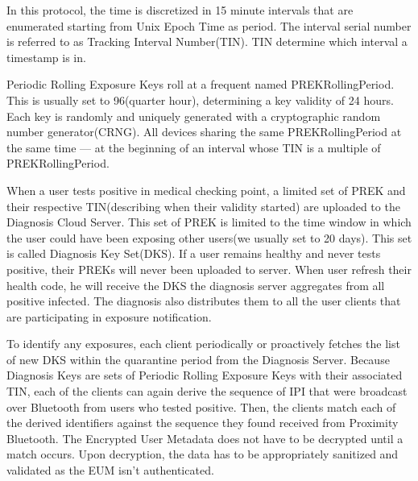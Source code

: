 \documentclass[11pt,en]{elegantpaper}
\begin{document}
In this protocol, the time is discretized in 15 minute intervals that are enumerated starting from Unix
Epoch Time as period. The interval serial number is referred to as Tracking Interval Number(TIN). TIN determine which interval a timestamp is in.

Periodic Rolling Exposure Keys roll at a frequent named PREKRollingPeriod. This is usually set to 96(quarter hour), determining a key validity of 24 hours. Each key is randomly and uniquely generated with a cryptographic random number generator(CRNG). All devices sharing the same PREKRollingPeriod at the same time — at the beginning of an interval whose TIN is a multiple of PREKRollingPeriod.

When a user tests positive in medical checking point, a limited set of PREK and their respective TIN(describing when their validity started) are uploaded to the Diagnosis Cloud Server. This set of PREK is limited to the time window in which the user could have been exposing other users(we usually set to 20 days). This set is called Diagnosis Key Set(DKS). If a user remains healthy and never tests positive, their PREKs will never been uploaded to server. When user refresh their health code, he will receive the DKS the diagnosis server aggregates from all positive infected. The diagnosis also distributes them to all the user clients that are participating in exposure notification.

To identify any exposures, each client periodically or proactively fetches the list of new DKS within the quarantine period from the Diagnosis Server. Because Diagnosis Keys are sets of Periodic Rolling Exposure Keys with their associated TIN, each of the clients can again derive the sequence of IPI that were broadcast over Bluetooth from users who tested positive. Then, the clients match each of the derived
identifiers against the sequence they found received from Proximity Bluetooth. The Encrypted User Metadata does not have to be decrypted until a match occurs. Upon decryption, the data has to be appropriately sanitized and validated as the EUM isn’t authenticated.



\end{document}
